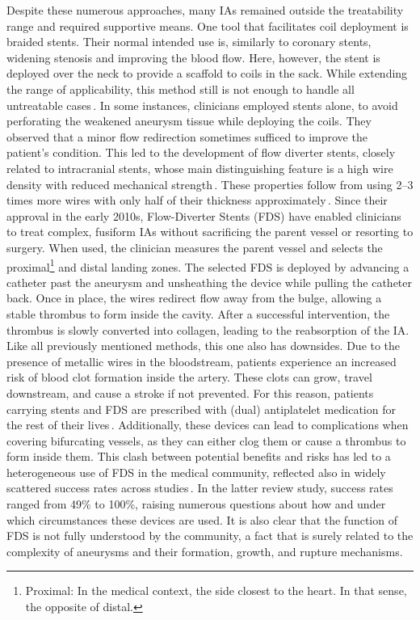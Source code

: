 Despite these numerous approaches, many IAs remained outside the treatability range and required supportive means. One tool that facilitates coil deployment is braided stents. Their normal intended use is, similarly to coronary stents, widening stenosis and improving the blood flow. Here, however, the stent is deployed over the neck to provide a scaffold to coils in the sack. While extending the range of applicability, this method still is not enough to handle all untreatable cases\,\cite{Shin2020}. In some instances, clinicians employed stents alone, to avoid perforating the weakened aneurysm tissue while deploying the coils. They observed that a minor flow redirection sometimes sufficed to improve the patient's condition. This led to the development of flow diverter stents, closely related to intracranial stents, whose main distinguishing feature is a high wire density with reduced mechanical strength\,\cite{Dandapat2021}. These properties follow from using 2--3 times more wires with only half of their thickness approximately\,\cite{Bouillot2014, Dmytriw2019, Maragkos2020}. Since their approval in the early 2010s, Flow-Diverter Stents (FDS) have enabled clinicians to treat complex, fusiform IAs without sacrificing the parent vessel or resorting to surgery. When used, the clinician measures the parent vessel and selects the proximal\footnote{Proximal: In the medical context, the side closest to the heart. In that sense, the opposite of distal.} and distal landing zones. The selected FDS is deployed by advancing a catheter past the aneurysm and unsheathing the device while pulling the catheter back. Once in place, the wires redirect flow away from the bulge, allowing a stable thrombus to form inside the cavity. After a successful intervention, the thrombus is slowly converted into collagen, leading to the reabsorption of the IA\@. Like all previously mentioned methods, this one also has downsides. Due to the presence of metallic wires in the bloodstream, patients experience an increased risk of blood clot formation inside the artery. These clots can grow, travel downstream, and cause a stroke if not prevented. For this reason, patients carrying stents and FDS are prescribed with (dual) antiplatelet medication for the rest of their lives\,\cite{Dmytriw2019, Maragkos2020, Dandapat2021}. Additionally, these devices can lead to complications when covering bifurcating vessels, as they can either clog them or cause a thrombus to form inside them. This clash between potential benefits and risks has led to a heterogeneous use of FDS in the medical community, reflected also in widely scattered success rates across studies\,\cite{Maragkos2020}. In the latter review study, success rates ranged from 49\% to 100\%, raising numerous questions about how and under which circumstances these devices are used. It is also clear that the function of FDS is not fully understood by the community, a fact that is surely related to the complexity of aneurysms and their formation, growth, and rupture mechanisms.

